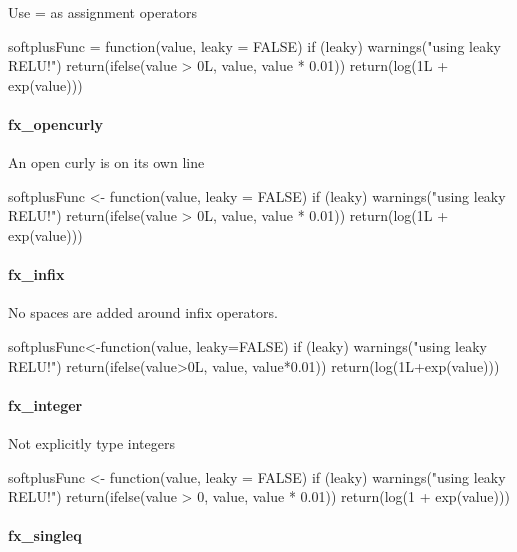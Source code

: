 Use = as assignment operators

\begin{example}
softplusFunc = function(value, leaky = FALSE) {
    if (leaky) {
        warnings("using leaky RELU!")
        return(ifelse(value > 0L, value, value * 0.01))
    }
    return(log(1L + exp(value)))
}
\end{example}

\paragraph{fx\_opencurly}

An open curly is on its own line

\begin{example}
softplusFunc <- function(value, leaky = FALSE) 
{
    if (leaky) 
    {
        warnings("using leaky RELU!")
        return(ifelse(value > 0L, value, value * 0.01))
    }
    return(log(1L + exp(value)))
}
\end{example}

\paragraph{fx\_infix}

No spaces are added around infix operators.

\begin{example}
softplusFunc<-function(value, leaky=FALSE) {
    if (leaky) {
        warnings("using leaky RELU!")
        return(ifelse(value>0L, value, value*0.01))
    }
    return(log(1L+exp(value)))
}
\end{example}

\paragraph{fx\_integer}

Not explicitly type integers

\begin{example}
softplusFunc <- function(value, leaky = FALSE) {
    if (leaky) {
        warnings("using leaky RELU!")
        return(ifelse(value > 0, value, value * 0.01))
    }
    return(log(1 + exp(value)))
}
\end{example}

\paragraph{fx\_singleq}

